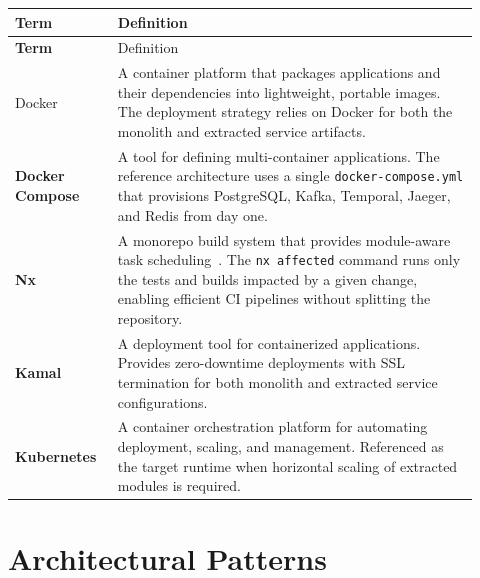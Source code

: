 \begin{longtable}{>{\bfseries}p{0.20\linewidth} p{0.72\linewidth}}
\toprule
Term & Definition \\
\midrule
\endfirsthead
\toprule
Term & Definition \\
\midrule
\endhead
\bottomrule
\endfoot

Docker &
A container platform that packages applications and their dependencies into lightweight, portable images. The deployment strategy relies on Docker for both the monolith and extracted service artifacts. \\

Docker Compose &
A tool for defining multi-container applications. The reference architecture uses a single \texttt{docker-compose.yml} that provisions PostgreSQL, Kafka, Temporal, Jaeger, and Redis from day one. \\

Nx &
A monorepo build system that provides module-aware task scheduling~\cite{nx2024}. The \texttt{nx affected} command runs only the tests and builds impacted by a given change, enabling efficient CI pipelines without splitting the repository. \\

Kamal &
A deployment tool for containerized applications. Provides zero-downtime deployments with SSL termination for both monolith and extracted service configurations. \\

Kubernetes &
A container orchestration platform for automating deployment, scaling, and management. Referenced as the target runtime when horizontal scaling of extracted modules is required. \\

\end{longtable}

\section{Architectural Patterns}

